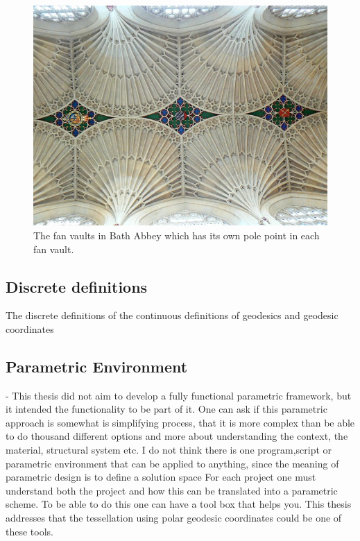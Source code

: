 \begin{figure}[H]
\centering
\includegraphics[width=1.0\linewidth ]{figure/Discussion/bathAbbey.jpg}
\caption{The fan vaults in Bath Abbey which has its own pole point in each fan vault.}
\end{figure}

\subsection{Discrete definitions}

The discrete definitions of the continuous definitions of geodesics and geodesic coordinates  

\subsection{Parametric Environment} - This thesis did not aim to develop a fully functional parametric framework, but it intended the functionality to be part of it. One can ask if this parametric approach is somewhat is simplifying process, that it is more complex than be able to do thousand different options and more about understanding the context, the material, structural system etc. I do not think there is one program,script or parametric environment that can be applied to anything, since the meaning of parametric design is to define a solution space  For each project one must understand both the project and how this can be translated into a parametric scheme. To be able to do this one can have a tool box that helps you. This thesis addresses that the tessellation using polar geodesic coordinates could be one of these tools.

